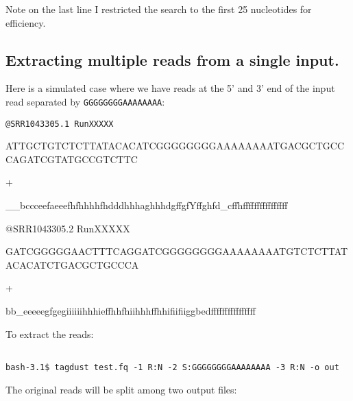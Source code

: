 \documentclass[11pt,a4paper,oneside]{book}
\begin{document}
Note on the last line I restricted the search to the first 25 nucleotides for efficiency. 


\subsection{Extracting multiple reads from a single input.}

Here is a simulated case where we have reads at the 5' and 3' end of the input read separated by {\tt GGGGGGGGAAAAAAAA}:

\vspace{10 mm}

{\small
\tt @SRR1043305.1 RunXXXXX 

{\color{red}ATTGCTGTCTCTTATACACATC}GGGGGGGGAAAAAAAA{\color{blue}TGACGCTGCCCAGATCGTATGCCGTCTTC}

+

\_\_bccceefaeeefhfhhhhfhdddhhhaghhhdgffgfYffghfd\_cffhffffffffffffffff

@SRR1043305.2 RunXXXXX 

{\color{red}GATCGGGGGAACTTTCAGGATC}GGGGGGGGAAAAAAAA{\color{blue}TGTCTCTTATACACATCTGACGCTGCCCA}

+

bb\_eeeeegfgegiiiiiihhhieffhhfhiihhhffhhifiifiiggbedffffffffffffffff

}

\vspace{10 mm}

To extract the reads: 

\vspace{10 mm}

{\small
\begin{verbatim}

bash-3.1$ tagdust test.fq -1 R:N -2 S:GGGGGGGGAAAAAAAA -3 R:N -o out
\end{verbatim}
}

The original reads will be split among two output files: 
\end{document}
